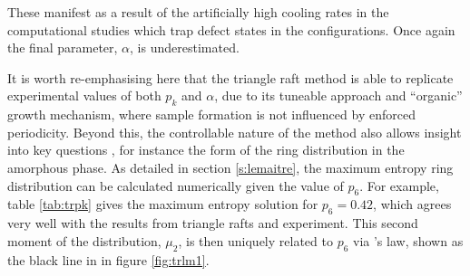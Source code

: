 \noindent These manifest as a result of the artificially high cooling rates in the computational studies which trap defect states in the configurations. 
Once again the final \aw{} parameter, $\alpha$, is underestimated.

It is worth re\--emphasising here that the triangle raft method is able to replicate experimental values of both $p_k$ and $\alpha$, due to its tuneable approach and ``organic'' growth mechanism, where sample formation is not influenced by enforced periodicity. 
Beyond this, the controllable nature of the method also allows insight into key questions%
, for instance the form of the ring distribution in the amorphous phase. 
As detailed in section \ref{s:lemaitre}, the maximum entropy ring distribution can be calculated numerically given the value of $p_6$.
For example, table \ref{tab:trpk} gives the maximum entropy solution for $p_6=0.42$, which agrees very well with the results from triangle rafts and experiment.
This second moment of the distribution, $\mu_2$, is then uniquely related to $p_6$ via \lm's law, shown as the black line in in figure \ref{fig:trlm1}.


